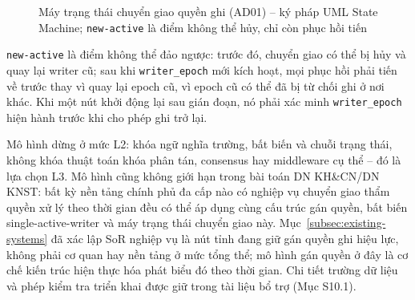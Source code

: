 \begin{figure}[H]
\caption{Máy trạng thái chuyển giao quyền ghi (AD01) -- ký pháp UML State Machine; \texttt{new-active} là điểm không thể hủy, chỉ còn phục hồi tiến}
\label{fig:writer-transfer}
\end{figure}

\texttt{new-active} là điểm không thể đảo ngược: trước đó, chuyển giao có thể bị hủy và quay lại writer cũ; sau khi \texttt{writer\_epoch} mới kích hoạt, mọi phục hồi phải tiến về trước thay vì quay lại epoch cũ, vì epoch cũ có thể đã bị từ chối ghi ở nơi khác. Khi một nút khởi động lại sau gián đoạn, nó phải xác minh \texttt{writer\_epoch} hiện hành trước khi cho phép ghi trở lại.

Mô hình dừng ở mức L2: khóa ngữ nghĩa trường, bất biến và chuỗi trạng thái, không khóa thuật toán khóa phân tán, consensus hay middleware cụ thể -- đó là lựa chọn L3. Mô hình cũng không giới hạn trong bài toán DN KH\&CN/DN KNST: bất kỳ nền tảng chính phủ đa cấp nào có nghiệp vụ chuyển giao thẩm quyền xử lý theo thời gian đều có thể áp dụng cùng cấu trúc gán quyền, bất biến single-active-writer và máy trạng thái chuyển giao này. Mục~\ref{subsec:existing-systems} đã xác lập SoR nghiệp vụ là nút tỉnh đang giữ gán quyền ghi hiệu lực, không phải cơ quan hay nền tảng ở mức tổng thể; mô hình gán quyền ở đây là cơ chế kiến trúc hiện thực hóa phát biểu đó theo thời gian. Chi tiết trường dữ liệu và phép kiểm tra triển khai được giữ trong tài liệu bổ trợ (Mục S10.1).

